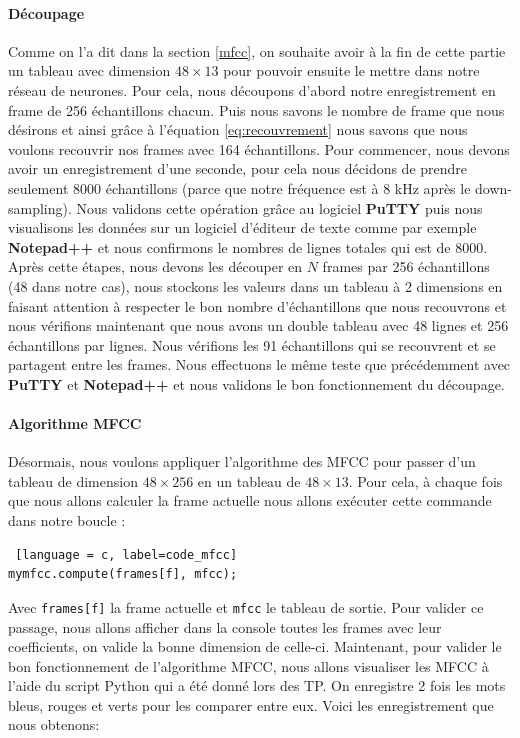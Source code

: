 \documentclass[a4paper,11pt]{article}
\begin{document}
\paragraph{Découpage}
Comme on l'a dit dans la section \ref{mfcc}, on souhaite avoir à la fin de cette partie un tableau avec dimension $48 \times 13$ pour pouvoir ensuite le mettre dans notre réseau de neurones. Pour cela, nous découpons d'abord notre enregistrement en frame de 256 échantillons chacun. Puis nous savons le nombre de frame que nous désirons et ainsi grâce à l'équation \ref{eq:recouvrement} nous savons que nous voulons recouvrir nos frames avec 164 échantillons. Pour commencer, nous devons avoir un enregistrement d'une seconde, pour cela nous décidons de prendre seulement 8000 échantillons (parce que notre fréquence est à 8 kHz après le down-sampling). Nous validons cette opération grâce au logiciel \textbf{PuTTY} puis nous visualisons les données sur un logiciel d'éditeur de texte comme par exemple \textbf{Notepad++} et nous confirmons le nombres de lignes totales qui est de 8000. Après cette étapes, nous devons les découper en $N$ frames par 256 échantillons (48 dans notre cas), nous stockons les valeurs dans un tableau à 2 dimensions en faisant attention à respecter le bon nombre d'échantillons que nous recouvrons et nous vérifions maintenant que nous avons un double tableau avec 48 lignes et 256 échantillons par lignes. Nous vérifions les 91 échantillons qui se recouvrent et se partagent entre les frames. Nous effectuons le même teste que précédemment avec \textbf{PuTTY} et \textbf{Notepad++} et nous validons le bon fonctionnement du découpage. 

\paragraph{Algorithme MFCC}
Désormais, nous voulons appliquer l'algorithme des MFCC pour passer d'un tableau de dimension $48 \times 256$ en un tableau de $48 \times 13$. Pour cela, à chaque fois que nous allons calculer la frame actuelle nous allons exécuter cette commande dans notre boucle : 
\begin{lstlisting} [language = c, label=code_mfcc]
mymfcc.compute(frames[f], mfcc);
\end{lstlisting}
Avec \texttt{frames[f]} la frame actuelle et \texttt{mfcc} le tableau de sortie. Pour valider ce passage, nous allons afficher dans la console toutes les frames avec leur coefficients, on valide la bonne dimension de celle-ci. Maintenant, pour valider le bon fonctionnement de l'algorithme MFCC, nous allons visualiser les MFCC à l'aide du script Python qui a été donné lors des TP. On enregistre 2 fois les mots bleus, rouges et verts pour les comparer entre eux. Voici les enregistrement que nous obtenons: 
\end{document}
